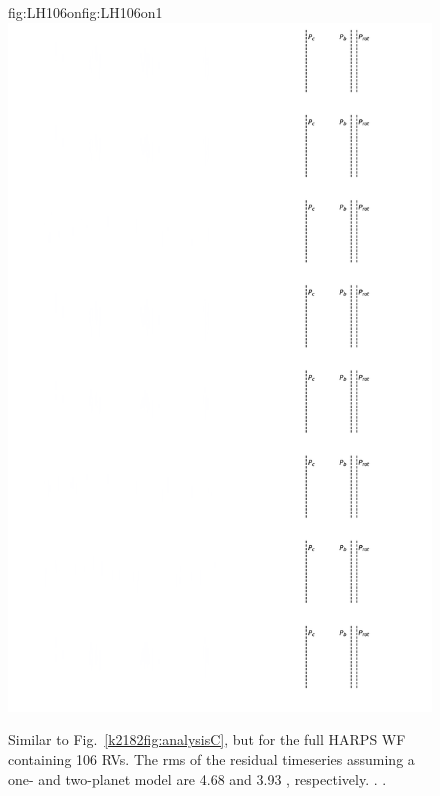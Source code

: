 \begin{figure}
\begin{ocg}{fig:LH106on}{fig:LH106on}{1}
  \includegraphics[width=0.8\hsize]{figures/analysisH106_lines.png}%
  \end{ocg}
  \hspace{-0.8\hsize}%
  \caption[RV timeseries and models from analysis of the K2-18 HARPS RVs.]
    {\small Similar to Fig.~\ref{k2182fig:analysisC}, but for the full HARPS WF containing 106 RVs.
    The rms of the residual timeseries assuming a one- and two-planet model are
    4.68 and 3.93 \mps{}, respectively.
    .
    .}
  \label{k2182fig:analysisH106}
\end{figure}


